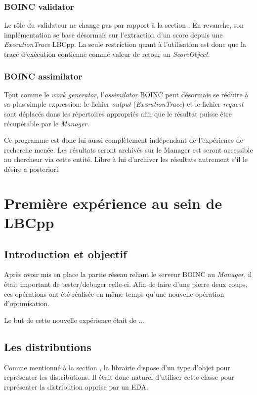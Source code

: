 \documentclass[a4paper, 11pt]{article}
\begin{document}
\subsubsection{BOINC validator}
Le rôle du validateur ne change pas par rapport à la section .%
En revanche, son implémentation se base désormais sur l'extraction d'un score depuis une \textit{ExecutionTrace} LBCpp. La seule restriction quant à l'utilisation est donc que la trace d'exécution contienne comme valeur de retour un \textit{ScoreObject}.

\subsubsection{BOINC assimilator}
Tout comme le \textit{work generator}, l'\textit{assimilator} \textsc{BOINC} peut désormais se réduire à sa plus simple expression: le fichier \textit{output} (\textit{ExecutionTrace}) et le fichier \textit{request} sont déplacés dans les répertoires appropriés afin que le résultat puisse être récupérable par le \textit{Manager}.

Ce programme est donc lui aussi complètement indépendant de l'expérience de recherche menée. Les résultats seront archivés sur le Manager est seront accessible au chercheur via cette entité. Libre à lui d'archiver les résultats autrement s'il le désire a posteriori. 


\section{Première expérience au sein de LBCpp}

\subsection{Introduction et objectif}
Après avoir mis en place la partie réseau reliant le serveur \textsc{BOINC} au \textit{Manager}, il était important de tester/debuger celle-ci. Afin de faire d'une pierre deux coups, ces opérations ont été réalisée en même temps qu'une nouvelle opération d'optimisation.

Le but de cette nouvelle expérience était de  ...

\subsection{Les distributions}
Comme mentionné à la section %
, la librairie dispose d'un type d'objet pour représenter les distributions. Il était donc naturel d'utiliser cette classe pour représenter la distribution apprise par un EDA. 
\end{document}
